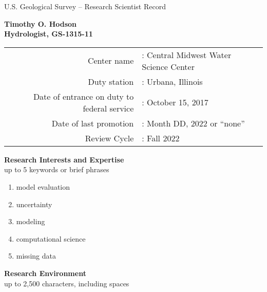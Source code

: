 \documentclass[12pt]{article}
\begin{document}




\centering \LARGE U.S. Geological Survey – Research Scientist Record \\
\vspace{10pt}
\normalsize

\centering \textbf{Timothy O. Hodson} \\

\centering \textbf{Hydrologist, GS-1315-11} \\

\vspace{5pt}

\begin{tabular}{@{}r@{}l}

\centering Center name &:	Central Midwest Water Science Center \\

\centering Duty station &:	Urbana, Illinois \\

\centering Date of entrance on duty to federal service &:	October 15, 2017\\

\centering Date of last promotion &:	Month DD, 2022 or “none” \\

\centering Review Cycle &:	Fall 2022\\

\end{tabular}

\vspace{10pt}
\centering \textbf{Research Interests and Expertise} \\
\centering up to 5 keywords or brief phrases \\

\begin{enumerate}
	\item model evaluation
	\item uncertainty
	\item modeling
	\item computational science
	\item missing data
\end{enumerate}


\vspace{10pt}
\centering \textbf{Research Environment} \\
\centering up to 2,500 characters, including spaces \\
\raggedright
\end{document}
